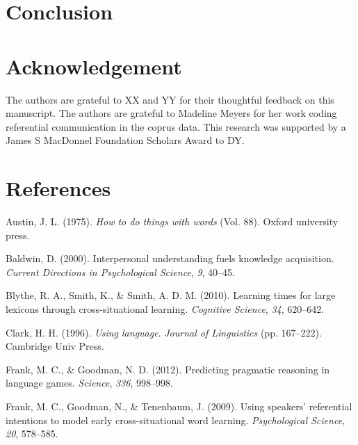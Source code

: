 \documentclass[english,,man,floatsintext]{apa6}
\begin{document}
\hypertarget{conclusion}{%
\section{Conclusion}\label{conclusion}}

\hypertarget{acknowledgement}{%
\section{Acknowledgement}\label{acknowledgement}}

The authors are grateful to XX and YY for their thoughtful feedback on this manuscript. The authors are grateful to Madeline Meyers for her work coding referential communication in the coprus data. This research was supported by a James S MacDonnel Foundation Scholars Award to DY.

\newpage

\hypertarget{references}{%
\section{References}\label{references}}

\setlength{\parindent}{-0.5in}
\setlength{\leftskip}{0.5in}

\hypertarget{refs}{}
\leavevmode\hypertarget{ref-austin1975}{}%
Austin, J. L. (1975). \emph{How to do things with words} (Vol. 88). Oxford university press.

\leavevmode\hypertarget{ref-baldwin2000}{}%
Baldwin, D. (2000). Interpersonal understanding fuels knowledge acquisition. \emph{Current Directions in Psychological Science}, \emph{9}, 40--45.

\leavevmode\hypertarget{ref-blythe2010}{}%
Blythe, R. A., Smith, K., \& Smith, A. D. M. (2010). Learning times for large lexicons through cross-situational learning. \emph{Cognitive Science}, \emph{34}, 620--642.

\leavevmode\hypertarget{ref-clark1996}{}%
Clark, H. H. (1996). \emph{Using language}. \emph{Journal of Linguistics} (pp. 167--222). Cambridge Univ Press.

\leavevmode\hypertarget{ref-frank2012}{}%
Frank, M. C., \& Goodman, N. D. (2012). Predicting pragmatic reasoning in language games. \emph{Science}, \emph{336}, 998--998.

\leavevmode\hypertarget{ref-frank2009}{}%
Frank, M. C., Goodman, N., \& Tenenbaum, J. (2009). Using speakers' referential intentions to model early cross-situational word learning. \emph{Psychological Science}, \emph{20}, 578--585.
\end{document}
